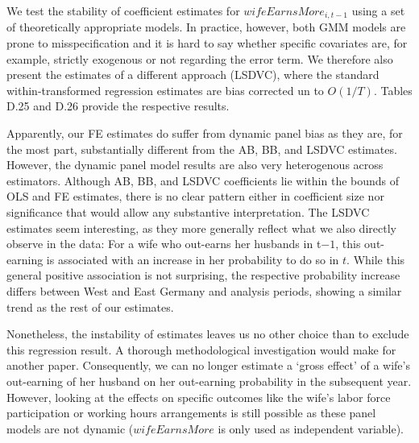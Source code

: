 \documentclass[a4paper,11pt]{scrartcl}
\begin{document}
\begin{appendix}
		We test the stability of coefficient estimates for $wifeEarnsMore_{i,t-1}$ using a set of theoretically appropriate models. In practice, however, both GMM models are prone to misspecification and it is hard to say whether specific covariates are, for example, strictly exogenous or not regarding the error term. We therefore also present the estimates of a different approach (LSDVC), where the standard within-transformed regression estimates are bias corrected un to $O(1/T)$. Tables D.25 and D.26 provide the respective results.

		Apparently, our FE estimates do suffer from dynamic panel bias as they are, for the most part, substantially different from the AB, BB, and LSDVC estimates. However, the dynamic panel model results are also very heterogenous across estimators. Although AB, BB, and LSDVC coefficients lie within the bounds of OLS and FE estimates, there is no clear pattern either in coefficient size nor significance that would allow any substantive interpretation. The LSDVC estimates seem interesting, as they more generally reflect what we also directly observe in the data: For a wife who out-earns her husbands in t$-1$, this out-earning is associated with an increase in her probability to do so in $t$. While this general positive association is not surprising, the respective probability increase differs between West and East Germany and analysis periods, showing a similar trend as the rest of our estimates.

		Nonetheless, the instability of estimates leaves us no other choice than to exclude this regression result. A thorough methodological investigation would make for another paper. Consequently, we can no longer estimate a `gross effect' of a wife's out-earning of her husband on her out-earning probability in the subsequent year. However, looking at the effects on specific outcomes like the wife's labor force participation or working hours arrangements is still possible as these panel models are not dynamic ($wifeEarnsMore$ is only used as independent variable).

		\renewcommand{\samplenote}{}

		\renewcommand{\specnote}{}

		\renewcommand{\xtfenoteA}{Notes: Unweighted regressions. Main specification, see regression notes above. All regressions except OLS with couple-fixed effects. AB denotes the Arellano-Bond estimator (difference GMM), implemented via \textit{xtabond2} by \cite{roodman2009how}. $L_{i,t-1}$ treated as (1) exogenous (independent of past and future errors), (2) predetermined (independent from contemporaneous and future errors, lags 1 and up used as instruments), (3) endogenous (possibly correlated with past, contemporaneous and future errors, lags 2 and up used as instruments). $wifeEarnsMore_{i,t-1}$ always treated as endogenous, $X_{it}$ always treated as exogenous. Instrument matrix collapsed (one column per time period and variable).}


\end{appendix}
\end{document}
